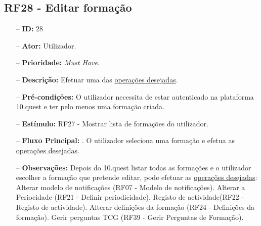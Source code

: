 \subsection{RF28 - Editar formação}
\begin{itemize}
	\item[--] \textbf{ID:} 28
	\item[--]  \textbf{Ator:} Utilizador.
	\item[--]  \textbf{Prioridade:} \textit{Must Have}.
	\item[--]  \textbf{Descrição:} Efetuar uma das \underline{operações desejadas}.
	\item[--]  \textbf{Pré-condições:} O utilizador necessita de estar autenticado na plataforma 10.quest e ter pelo menos uma formação criada.
	\item[--]  \textbf{Estímulo:} RF27 - Mostrar lista de formações do utilizador.
	\item[--]  \textbf{Fluxo Principal:} 
		. O utilizador seleciona uma formação e efetua as \underline{operações desejadas}.
	\begin{comment}
	\item[--]  \textbf{Fluxo de Excepção:} 
		\subitem 1a. O 10.quest não consegue efetuar o pedido à API do TCG devido a uma falha na conexão.
		\subitem 1a1. O 10.quest notifica o utilizador que ocorreu uma falha na conexão.
		\subitem 1b. O serviço do TCG (API) está indisponível.
		\subitem 1b1. O 10.quest notifica o utilizador que o serviço do TCG está temporariamente indisponível.
	\end{comment} 
	\item[--]  \textbf{Observações:} Depois do 10.quest listar todas as formações e o utilizador escolher a formação que pretende editar, pode efetuar as \underline{operações desejadas}:
		\subitem Alterar modelo de notificações (RF07 - Modelo de notificações).
		\subitem Alterar a Periocidade (RF21 - Definir periodicidade).
		\subitem Registo de actividade(RF22 - Registo de actividade).
		\subitem Alterar definições da formação (RF24 - Definições da formação).
		\subitem Gerir perguntas TCG (RF39 - Gerir Perguntas de Formação).
\end{itemize}
\newpage

